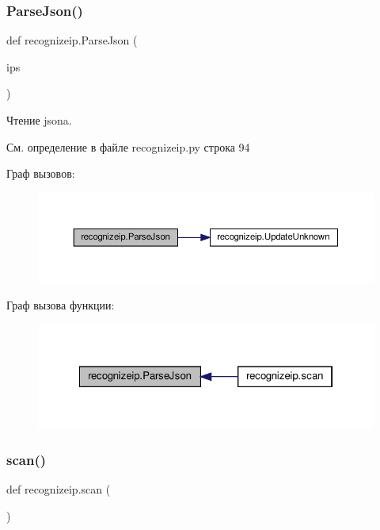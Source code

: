 \subsubsection{\texorpdfstring{Parse\+Json()}{ParseJson()}}
{\footnotesize\ttfamily def recognizeip.\+Parse\+Json (\begin{DoxyParamCaption}\item[{}]{ips }\end{DoxyParamCaption})}



Чтение json\textquotesingle{}a. 



См. определение в файле recognizeip.\+py строка 94

Граф вызовов\+:\nopagebreak
\begin{figure}[H]
\begin{center}
\leavevmode
\includegraphics[width=350pt]{namespacerecognizeip_ad9b913f5fd7d2c429fb56302952d3d74_cgraph}
\end{center}
\end{figure}
Граф вызова функции\+:\nopagebreak
\begin{figure}[H]
\begin{center}
\leavevmode
\includegraphics[width=322pt]{namespacerecognizeip_ad9b913f5fd7d2c429fb56302952d3d74_icgraph}
\end{center}
\end{figure}
\mbox{\label{namespacerecognizeip_a9fb9f625acd36513818c1ac2f236070d}} 
\subsubsection{\texorpdfstring{scan()}{scan()}}
{\footnotesize\ttfamily def recognizeip.\+scan (\begin{DoxyParamCaption}{ }\end{DoxyParamCaption})}



